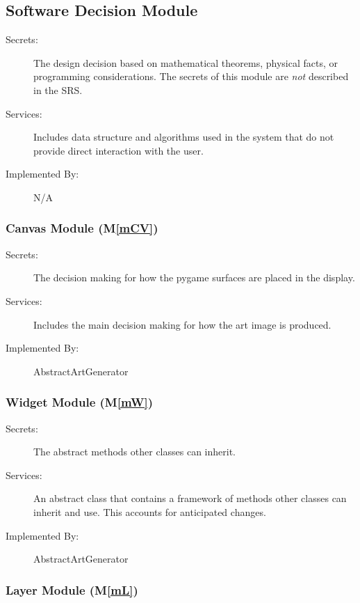 \documentclass[12pt, titlepage]{article}
\newcommand{\mref}[1]{M\ref{#1}}
\begin{document}
\subsection{Software Decision Module}

\begin{description}
\item[Secrets:] The design decision based on mathematical theorems, physical
  facts, or programming considerations. The secrets of this module are
  \emph{not} described in the SRS.
\item[Services:] Includes data structure and algorithms used in the system that
  do not provide direct interaction with the user. 
\item[Implemented By:] N/A
\end{description}

\subsubsection{Canvas Module (\mref{mCV})}

\begin{description}
\item[Secrets:] The decision making for how the pygame surfaces are placed in the display.
\item[Services:] Includes the main decision making for how the art image is produced.
\item[Implemented By:] AbstractArtGenerator
\end{description}

\subsubsection{Widget Module (\mref{mW})}

\begin{description}
\item[Secrets:] The abstract methods other classes can inherit.
\item[Services:] An abstract class that contains a framework of methods other classes can inherit and use. This accounts for anticipated changes.
\item[Implemented By:] AbstractArtGenerator
\end{description}

\subsubsection{Layer Module (\mref{mL})}
\end{document}
